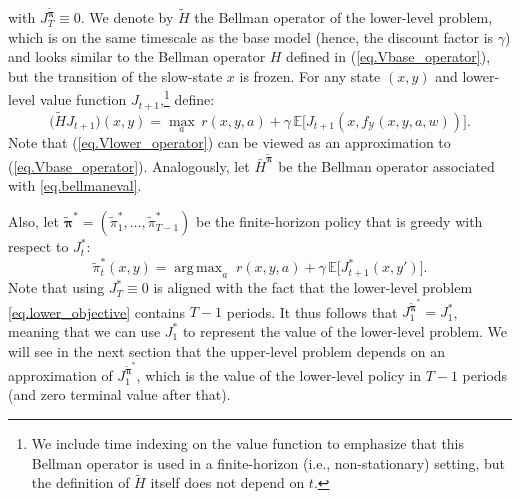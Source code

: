 \documentclass[11pt, notitlepage]{article}
\DeclareMathOperator*{\argmax}{arg\,max}
\newcommand{\E}{\mathbb{E}}
\newcommand{\1}{\mathbbm{1}}
\begin{document}
with $J_T^{\tilde{\boldsymbol{\pi}}} \equiv 0$. We denote by $\tilde{H}$ the Bellman operator of the lower-level problem, which is on the same timescale as the base model (hence, the discount factor is $\gamma$) and looks similar to the Bellman operator $H$ defined in (\ref{eq.Vbase_operator}), but the transition of the slow-state $x$ is frozen. For any state $(x,y)$ and lower-level value function $J_{t+1}$,\footnote{We include time indexing on the value function to emphasize that this Bellman operator is used in a finite-horizon (i.e., non-stationary) setting, but the definition of $\tilde{H}$ itself does not depend on $t$.} define:
\begin{equation} \label{eq.Vlower_operator}
    \bigl (\tilde{H} J_{t+1} \bigr) (x,y) = \max_{a} \, r(x,y,a) + \gamma \, \E \bigl[J_{t+1}(x, f_{\mathcal{Y}}(x,y,a,w))\bigr].
\end{equation}
Note that (\ref{eq.Vlower_operator}) can be viewed as an approximation to (\ref{eq.Vbase_operator}). Analogously, let $\bar{H}^{\tilde{\boldsymbol{\pi}}}$ be the Bellman operator associated with \eqref{eq.bellmaneval}.


Also, let $\tilde{\boldsymbol{\pi}}^* = (\tilde{\pi}^*_1, \ldots, \tilde{\pi}^*_{T-1})$ be the finite-horizon policy that is greedy with respect to $J_t^*$:
\[
\tilde{\pi}^*_t(x, y) = \argmax_{a} \; r(x,y,a) + \gamma \, \E \bigl[J_{t+1}^*(x,y')\bigr].
\]
Note that using $J_T^* \equiv 0$ is aligned with the fact that the lower-level problem \eqref{eq.lower_objective} contains $T-1$ periods. It thus follows that $J_1^{\tilde{\boldsymbol{\pi}}^*} = J_1^*$, meaning that we can use $J_1^*$ to represent the value of the lower-level problem. We will see in the next section that the upper-level problem depends on an approximation of $J_1^{\tilde{\boldsymbol{\pi}}^*}$, which is the value of the lower-level policy in $T-1$ periods (and zero terminal value after that).
\end{document}
